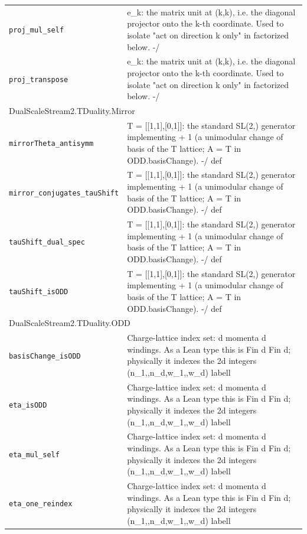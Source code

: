 \begin{longtable}{p{}p{}}
\quad\texttt{\footnotesize proj\_mul\_self} & {\footnotesize e\_k: the matrix unit at (k,k), i.e. the diagonal projector onto the k-th coordinate. Used to isolate "act on direction k only" in factorized below. -/} \\
\quad\texttt{\footnotesize proj\_transpose} & {\footnotesize e\_k: the matrix unit at (k,k), i.e. the diagonal projector onto the k-th coordinate. Used to isolate "act on direction k only" in factorized below. -/} \\
\multicolumn{2}{l}{\textsf{\small DualScaleStream2.TDuality.Mirror}} \\
\quad\texttt{\footnotesize mirrorTheta\_antisymm} & {\footnotesize T = [[1,1],[0,1]]: the standard SL(2,) generator implementing    + 1 (a unimodular change of basis of the T lattice; A = T in ODD.basisChange). -/ def} \\
\quad\texttt{\footnotesize mirror\_conjugates\_tauShift} & {\footnotesize T = [[1,1],[0,1]]: the standard SL(2,) generator implementing    + 1 (a unimodular change of basis of the T lattice; A = T in ODD.basisChange). -/ def} \\
\quad\texttt{\footnotesize tauShift\_dual\_spec} & {\footnotesize T = [[1,1],[0,1]]: the standard SL(2,) generator implementing    + 1 (a unimodular change of basis of the T lattice; A = T in ODD.basisChange). -/ def} \\
\quad\texttt{\footnotesize tauShift\_isODD} & {\footnotesize T = [[1,1],[0,1]]: the standard SL(2,) generator implementing    + 1 (a unimodular change of basis of the T lattice; A = T in ODD.basisChange). -/ def} \\
\multicolumn{2}{l}{\textsf{\small DualScaleStream2.TDuality.ODD}} \\
\quad\texttt{\footnotesize basisChange\_isODD} & {\footnotesize Charge-lattice index set: d momenta  d windings. As a Lean type this is Fin d  Fin d; physically it indexes the 2d integers (n\_1,,n\_d,w\_1,,w\_d) labell} \\
\quad\texttt{\footnotesize eta\_isODD} & {\footnotesize Charge-lattice index set: d momenta  d windings. As a Lean type this is Fin d  Fin d; physically it indexes the 2d integers (n\_1,,n\_d,w\_1,,w\_d) labell} \\
\quad\texttt{\footnotesize eta\_mul\_self} & {\footnotesize Charge-lattice index set: d momenta  d windings. As a Lean type this is Fin d  Fin d; physically it indexes the 2d integers (n\_1,,n\_d,w\_1,,w\_d) labell} \\
\quad\texttt{\footnotesize eta\_one\_reindex} & {\footnotesize Charge-lattice index set: d momenta  d windings. As a Lean type this is Fin d  Fin d; physically it indexes the 2d integers (n\_1,,n\_d,w\_1,,w\_d) labell} \\

\end{longtable}
